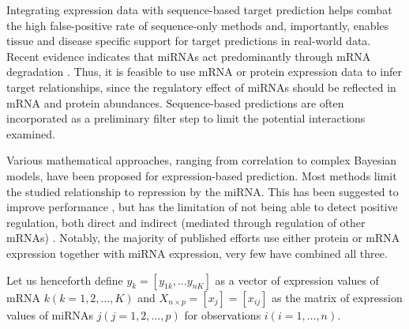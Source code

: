 Integrating expression data with sequence-based target prediction helps combat
the high false-positive rate of sequence-only methods and, importantly,
enables tissue and disease specific support for target predictions in real-world
data. Recent evidence indicates that miRNAs act predominantly through
mRNA degradation \citep{Guo2010}. Thus, it is feasible to use mRNA or protein
expression data to infer target relationships, since the regulatory effect of
miRNAs should be reflected in mRNA and protein abundances. Sequence-based
predictions are often incorporated as a preliminary filter step to limit the
potential interactions examined.

Various mathematical approaches, ranging from correlation to complex Bayesian
models, have been proposed for expression-based prediction. Most
methods limit the studied relationship to repression by the miRNA. This has
been suggested to improve performance \citep{Muniategui2012}, but has the
limitation of not being able to detect positive regulation, both direct and
indirect (mediated through regulation of other mRNAs) \citep{Engelmann2012}.
Notably, the majority of published efforts use either protein or mRNA 
expression together with miRNA expression, very few have combined all three.



Let us henceforth define $y_k = [y_{1k}, \dotsc y_{nK}]$ as a vector of expression
values of mRNA $k (k = 1, 2, \dotsc, K)$ and $X_{n \times p} = [x_j] =
[x_{ij}]$ as the matrix of expression values of miRNAs $j (j = 1, 2, \ldots,
p)$ for observations $i (i = 1, \ldots, n)$.

